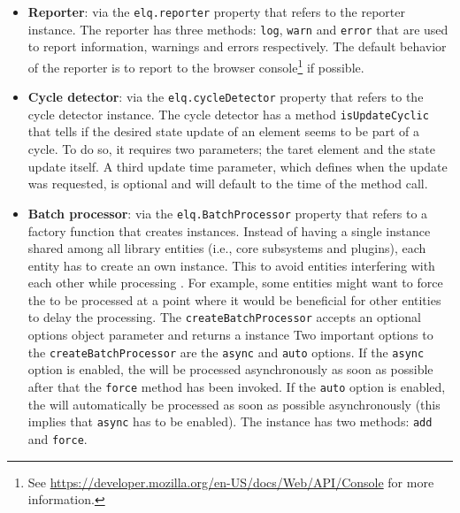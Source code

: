 \documentclass[a4paper,11pt]{kth-mag}
\newcommand{\code}[1]{\texttt{#1}}
\begin{document}
        \begin{itemize}
          \item 
            \textbf{Reporter}: via the \code{elq.reporter} property that refers to the reporter instance.
            The reporter has three methods: \code{log}, \code{warn} and \code{error} that are used to report information, warnings and errors respectively.
            The default behavior of the reporter is to report to the \gls{browser} console\footnote{See \url{https://developer.mozilla.org/en-US/docs/Web/API/Console} for more information.} if possible.
          \item
            \textbf{Cycle detector}: via the \code{elq.cycleDetector} property that refers to the cycle detector instance.
            The cycle detector has a method \code{isUpdateCyclic} that tells if the desired state update of an element seems to be part of a cycle.
            To do so, it requires two parameters; the taret element and the state update itself.
            A third update time parameter, which defines when the update was requested, is optional and will default to the time of the method call.
          \item 
            \textbf{Batch processor}: via the \code{elq.BatchProcessor} property that refers to a factory function that creates  instances.
            Instead of having a single  instance shared among all library entities (i.e., core subsystems and plugins), each entity has to create an own instance.
            This to avoid entities interfering with each other while processing .
            For example, some entities might want to force the  to be processed at a point where it would be beneficial for other entities to delay the processing.
            The \code{createBatchProcessor} accepts an optional options object parameter and returns a  instance
            Two important options to the \code{createBatchProcessor} are the \code{async} and \code{auto} options.
            If the \code{async} option is enabled, the  will be processed asynchronously as soon as possible after that the \code{force} method has been invoked.
            If the \code{auto} option is enabled, the  will automatically be processed as soon as possible asynchronously (this implies that \code{async} has to be enabled).
            The  instance has two methods: \code{add} and \code{force}.

\end{itemize}
\end{document}
